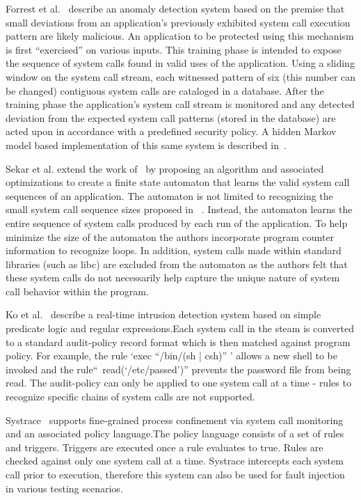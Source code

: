 Forrest et al.~\cite{DBLP:conf/sp/ForrestHSL96} describe
an anomaly detection system based on the premise that small deviations from
an application's previously exhibited system call execution pattern are likely
malicious. An application to be protected using this mechanism is first
“exercised” on various inputs. This training phase is intended to expose the
sequence of system calls found in valid uses of the application.
Using a sliding
window on the system call stream,
each witnessed pattern of six (this number can
be changed) contiguous system calls are cataloged in a database. After the
training phase the application's system call stream
is monitored and any detected
deviation from the expected system call patterns (stored in the database) are
acted upon in accordance with a predefined security policy.
A hidden Markov model
based implementation of this same system
is described in~\cite{DBLP:conf/sp/WarrenderFP99}.

Sekar et al.\cite{DBLP:conf/sp/SekarBDB01} extend the work
of~\cite{DBLP:conf/sp/ForrestHSL96} by proposing
an algorithm and associated optimizations
to create a finite state automaton that
learns the valid system call sequences of an application.
The automaton is not
limited to recognizing the small system call sequence sizes proposed in
~\cite{DBLP:conf/sp/ForrestHSL96}.
Instead,
the automaton learns the entire
sequence of system calls produced by each
run of the application.
To help minimize the size
of the automaton
the authors incorporate program counter information to recognize
loops.
In addition,
system calls made within standard libraries (such as libc)
are excluded from the automaton
as the authors felt that these system calls do not
necessarily help capture the unique nature of system call behavior within the
program.

Ko et al.~\cite{DBLP:conf/acsac/KoFL94} describe a real-time intrusion detection system
based on simple predicate logic and regular expressions.Each system call in the
steam is converted to a standard audit-policy record format which is then
matched against program policy. For example, the rule ‘exec “/bin/(sh | csh)” ’
allows a new shell to be invoked and the rule“~read(‘/etc/passed’)” prevents the
password file from being read. The audit-policy can only be applied to one
system call at a time - rules to recognize specific chains of system calls are
not supported.

Systrace~\cite{DBLP:conf/uss/Provos03} supports fine-grained process confinement
via system call monitoring and an associated policy language.The policy language
consists of a set of rules and triggers.
Triggers are executed once a rule
evaluates to true. Rules are checked against only one system call at a time.
Systrace intercepts each system call prior to execution, therefore this system
can also be used for fault injection in various testing scenarios.

